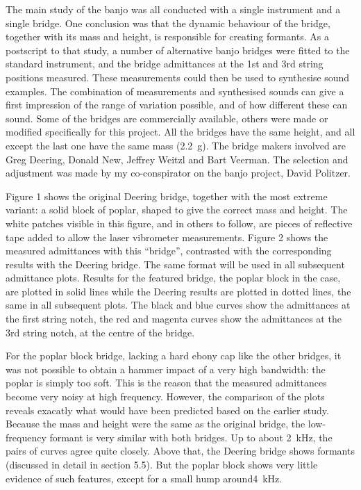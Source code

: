   The main study of the banjo was all conducted with a single instrument and a 
  single bridge. One conclusion was that the dynamic behaviour of the bridge, 
  together with its mass and height, is responsible for creating formants. As a 
  postscript to that study, a number of alternative banjo bridges were fitted 
  to the standard instrument, and the bridge admittances at the 1st and 3rd 
  string positions measured. These measurements could then be used to 
  synthesise sound examples. The combination of measurements and synthesised 
  sounds can give a first impression of the range of variation possible, and of 
  how different these can sound. Some of the bridges are commercially 
  available, others were made or modified specifically for this project. All 
  the bridges have the same height, and all except the last one have the same 
  mass (2.2~g). The bridge makers involved are Greg Deering, Donald New, 
  Jeffrey Weitzl and Bart Veerman. The selection and adjustment was made by my 
  co-conspirator on the banjo project, David Politzer. 

  Figure 1 shows the original Deering bridge, together with the most extreme 
  variant: a solid block of poplar, shaped to give the correct mass and height. 
  The white patches visible in this figure, and in others to follow, are pieces 
  of reflective tape added to allow the laser vibrometer measurements. Figure 2 
  shows the measured admittances with this ``bridge'', contrasted with the 
  corresponding results with the Deering bridge. The same format will be used 
  in all subsequent admittance plots. Results for the featured bridge, the 
  poplar block in the case, are plotted in solid lines while the Deering 
  results are plotted in dotted lines, the same in all subsequent plots. The 
  black and blue curves show the admittances at the first string notch, the red 
  and magenta curves show the admittances at the 3rd string notch, at the 
  centre of the bridge. 

  For the poplar block bridge, lacking a hard ebony cap like the other bridges, 
  it was not possible to obtain a hammer impact of a very high bandwidth: the 
  poplar is simply too soft. This is the reason that the measured admittances 
  become very noisy at high frequency. However, the comparison of the plots 
  reveals exacatly what would have been predicted based on the earlier study. 
  Because the mass and height were the same as the original bridge, the 
  low-frequency formant is very similar with both bridges. Up to about 2~kHz, 
  the pairs of curves agree quite closely. Above that, the Deering bridge shows 
  formants (discussed in detail in section 5.5). But the poplar block shows 
  very little evidence of such features, except for a small hump around4~kHz. 

